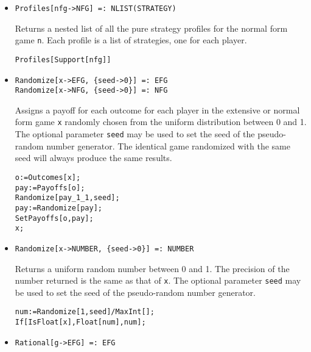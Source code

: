 \begin{itemize}
\item{}
\protect \large \begin{verbatim}
Profiles[nfg->NFG] =: NLIST(STRATEGY) 
\end{verbatim}\normalsize

\bd 
Returns a nested list of all the pure strategy profiles for the normal
form game \verb+n+.  Each profile is a list of strategies, one for
each player.
\begin{verbatim}
Profiles[Support[nfg]]
\end{verbatim} 
\ed



\item{}
\protect \large \begin{verbatim}
Randomize[x->EFG, {seed->0}] =: EFG 
Randomize[x->NFG, {seed->0}] =: NFG 
\end{verbatim}\normalsize

\bd 
Assigns a payoff for each outcome for each player in the extensive
or normal form game \verb+x+ randomly chosen from the uniform
distribution between 0 and 1.  The optional parameter \verb+seed+ may
be used to set the seed of the pseudo-random number generator.  The
identical game randomized with the same seed will always produce the
same results.
\begin{verbatim}
o:=Outcomes[x];
pay:=Payoffs[o];
Randomize[pay_1_1,seed];
pay:=Randomize[pay];
SetPayoffs[o,pay];
x;
\end{verbatim} 
\ed

\item{}
\protect \large \begin{verbatim}
Randomize[x->NUMBER, {seed->0}] =: NUMBER 
\end{verbatim}\normalsize

\bd 
Returns a uniform random number between 0 and 1.  The precision of the
number returned is the same as that of \verb+x+.  The optional
parameter \verb+seed+ may be used to set the seed of the pseudo-random
number generator. 
\begin{verbatim}
num:=Randomize[1,seed]/MaxInt[];
If[IsFloat[x],Float[num],num];
\end{verbatim} 
\ed

\item{}
\protect \large \begin{verbatim}
Rational[g->EFG] =: EFG 
\end{verbatim}\normalsize


\end{itemize}
